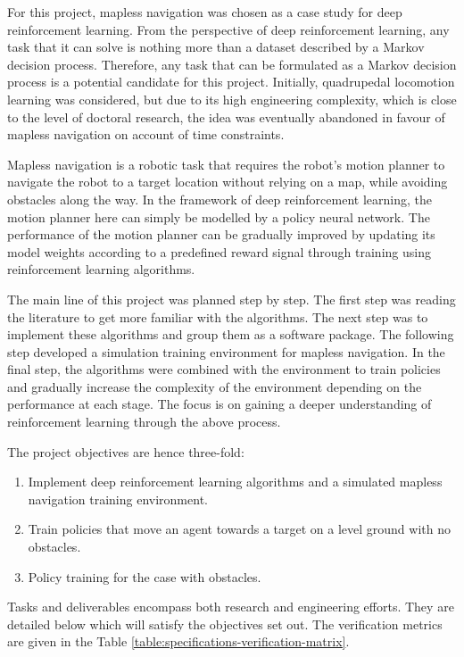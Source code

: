 For this project, mapless navigation was chosen as a case study for deep reinforcement learning. From the perspective of deep reinforcement learning, any task that it can solve is nothing more than a dataset described by a Markov decision process. Therefore, any task that can be formulated as a Markov decision process is a potential candidate for this project. Initially, quadrupedal locomotion learning was considered, but due to its high engineering complexity, which is close to the level of doctoral research, the idea was eventually abandoned in favour of mapless navigation on account of time constraints.

Mapless navigation is a robotic task that requires the robot's motion planner to navigate the robot to a target location without relying on a map, while avoiding obstacles along the way. In the framework of deep reinforcement learning, the motion planner here can simply be modelled by a policy neural network. The performance of the motion planner can be gradually improved by updating its model weights according to a predefined reward signal through training using reinforcement learning algorithms.

The main line of this project was planned step by step. The first step was reading the literature to get more familiar with the algorithms. The next step was to implement these algorithms and group them as a software package. The following step developed a simulation training environment for mapless navigation. In the final step, the algorithms were combined with the environment to train policies and gradually increase the complexity of the environment depending on the performance at each stage. The focus is on gaining a deeper understanding of reinforcement learning through the above process.

The project objectives are hence three-fold:
\begin{enumerate}[label=\arabic*), nosep, leftmargin=*]
    \item Implement deep reinforcement learning algorithms and a simulated mapless navigation training environment.
    \item Train policies that move an agent towards a target on a level ground with no obstacles.
    \item Policy training for the case with obstacles.
\end{enumerate}
Tasks and deliverables encompass both research and engineering efforts. They are detailed below which will satisfy the objectives set out. The verification metrics are given in the Table \ref{table:specifications-verification-matrix}.


